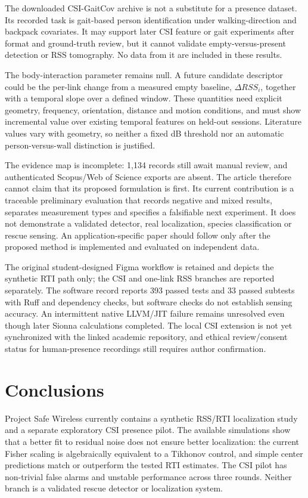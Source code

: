 \documentclass[sensors,article,submit,oneauthor]{Definitions/mdpi}
\begin{document}
The downloaded CSI-GaitCov archive is not a substitute for a presence dataset. Its recorded task is gait-based person identification under walking-direction and backpack covariates. It may support later CSI feature or gait experiments after format and ground-truth review, but it cannot validate empty-versus-present detection or RSS tomography. No data from it are included in these results.

The body-interaction parameter remains null. A future candidate descriptor could be the per-link change from a measured empty baseline, $\Delta RSS_i$, together with a temporal slope over a defined window. These quantities need explicit geometry, frequency, orientation, distance and motion conditions, and must show incremental value over existing temporal features on held-out sessions. Literature values vary with geometry, so neither a fixed dB threshold nor an automatic person-versus-wall distinction is justified.

The evidence map is incomplete: 1,134 records still await manual review, and authenticated Scopus/Web of Science exports are absent. The article therefore cannot claim that its proposed formulation is first. Its current contribution is a traceable preliminary evaluation that records negative and mixed results, separates measurement types and specifies a falsifiable next experiment. It does not demonstrate a validated detector, real localization, species classification or rescue sensing. An application-specific paper should follow only after the proposed method is implemented and evaluated on independent data.

The original student-designed Figma workflow is retained and depicts the synthetic RTI path only; the CSI and one-link RSS branches are reported separately. The software record reports 393 passed tests and 33 passed subtests with Ruff and dependency checks, but software checks do not establish sensing accuracy. An intermittent native LLVM/JIT failure remains unresolved even though later Sionna calculations completed. The local CSI extension is not yet synchronized with the linked academic repository, and ethical review/consent status for human-presence recordings still requires author confirmation.
\section{Conclusions}

Project Safe Wireless currently contains a synthetic RSS/RTI localization study and a separate exploratory CSI presence pilot. The available simulations show that a better fit to residual noise does not ensure better localization: the current Fisher scaling is algebraically equivalent to a Tikhonov control, and simple center predictions match or outperform the tested RTI estimates. The CSI pilot has non-trivial false alarms and unstable performance across three rounds. Neither branch is a validated rescue detector or localization system.
\end{document}

